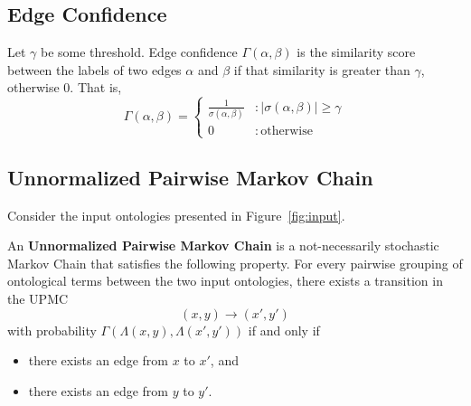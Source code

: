 \documentclass[letterpaper,twocolumn,12pt]{article}
\begin{document}
\subsection{Edge Confidence}

\begin{defn}
Let $\gamma$ be some threshold. Edge confidence $\Gamma \left( \alpha, \beta \right)$ is the similarity score between the labels of two edges $\alpha$ and $\beta$ if that similarity is greater than $\gamma$, otherwise $0$. That is,
$$ \Gamma \left( \alpha, \beta \right) = \left\{
   	 \begin{array}{ll}
           \frac{1}{\sigma \left( \alpha, \beta \right)} & : \vert \sigma \left( \alpha, \beta \right) \vert \geq \gamma \\
           0                                             & : \mathrm{otherwise}
     \end{array}
   \right.$$
\end{defn}

\subsection{Unnormalized Pairwise Markov Chain}

Consider the input ontologies presented in Figure~\ref{fig:input}.

\begin{defn}
An {\bf Unnormalized Pairwise Markov Chain} is a not-necessarily stochastic Markov Chain that satisfies the following property.
For every pairwise grouping of ontological terms between the two input ontologies, there exists a transition in the UPMC
$$ (x, y) \rightarrow (x', y') $$
with probability $\Gamma(\Lambda(x, y), \Lambda(x', y'))$ if and only if
\begin{itemize}
\item there exists an edge from $x$ to $x'$, and
\item there exists an edge from $y$ to $y'$.
\end{itemize}
\end{defn}

\begin{figure*}
\centering
\SetVertexNormal[
	Shape = circle,
    LineWidth = 1pt
]
\SetUpEdge[
	lw = 1pt,
    color = orange,
    labelcolor = white
]
\caption{Example Input Ontologies with Object Properties}
\label{fig:input}
\end{figure*}
\end{document}
